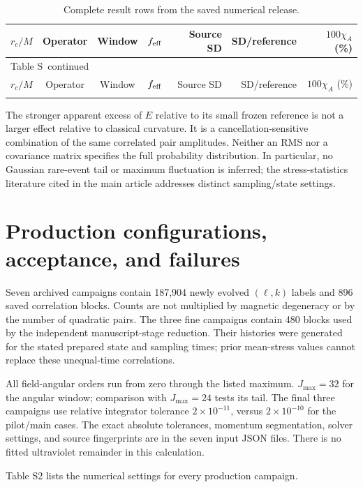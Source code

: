 \documentclass[10pt]{article}
\renewcommand{\thetable}{S\arabic{table}}
\begin{document}
\small
\begin{longtable}{@{}ccccrrr@{}}
\caption{Complete result rows from the saved numerical release.}\label{tab:all}\\
\toprule
$r_c/M$ & Operator & Window & $f_{\rm eff}$ & Source SD & SD/reference & $100\chi_A$ (\%)\\
\midrule
\endfirsthead
\multicolumn{7}{l}{Table \thetable\ continued}\\\toprule
$r_c/M$ & Operator & Window & $f_{\rm eff}$ & Source SD & SD/reference & $100\chi_A$ (\%)\\\midrule
\endhead
\bottomrule\endfoot

\end{longtable}
\normalsize

The stronger apparent excess of $E$ relative to its small frozen reference is not a larger effect relative to classical curvature. It is a cancellation-sensitive combination of the same correlated pair amplitudes. Neither an RMS nor a covariance matrix specifies the full probability distribution. In particular, no Gaussian rare-event tail or maximum fluctuation is inferred; the stress-statistics literature cited in the main article addresses distinct sampling/state settings.

\section{Production configurations, acceptance, and failures}
Seven archived campaigns contain 187,904 newly evolved $(\ell,k)$ labels and 896 saved correlation blocks. Counts are not multiplied by magnetic degeneracy or by the number of quadratic pairs. The three fine campaigns contain 480 blocks used by the independent manuscript-stage reduction. Their histories were generated for the stated prepared state and sampling times; prior mean-stress values cannot replace these unequal-time correlations.

All field-angular orders run from zero through the listed maximum. $J_{\max}=32$ for the angular window; comparison with $J_{\max}=24$ tests its tail. The final three campaigns use relative integrator tolerance $2\times10^{-11}$, versus $2\times10^{-10}$ for the pilot/main cases. The exact absolute tolerances, momentum segmentation, solver settings, and source fingerprints are in the seven input JSON files. There is no fitted ultraviolet remainder in this calculation.

Table S2 lists the numerical settings for every production campaign.
\end{document}
